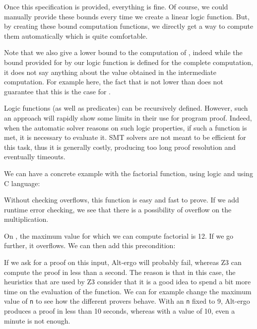 Once this specification is provided, everything is fine. Of course, we could
manually provide these bounds every time we create a linear logic function. But,
by creating these bound computation functions, we directly get a way to compute
them automatically which is quite comfortable.

Note that we also give a lower bound to the computation of ,
indeed while the bound provided for  by our logic function is
defined for the complete computation, it does not say anything about the value
obtained in the intermediate computation. For example here, the fact that
 is not lower than  does not
guarantee that this is the case for . 





Logic functions (as well as predicates) can be recursively defined.
However, such an approach will rapidly show some limits in their use for
program proof. Indeed, when the automatic solver reasons on such logic
properties, if such a function is met, it is necessary to evaluate it.
SMT solvers are not meant to be efficient for this task, thus it is generally
costly, producing too long proof resolution and eventually timeouts.

We can have a concrete example with the factorial function, using logic
and using C language:






Without checking overflows, this function is easy and fast to prove. If
we add runtime error checking, we see that there is a possibility of
overflow on the multiplication.



On , the maximum value for which we can compute
factorial is 12. If we go further, it overflows. We can then add this
precondition:






If we ask for a proof on this input, Alt-ergo will probably fail,
whereas Z3 can compute the proof in less than a second. The reason is
that in this case, the heuristics that are used by Z3 consider that it
is a good idea to spend a bit more time on the evaluation of the
function. We can for example change the maximum value of \texttt{n} to
see how the different provers behave. With an \texttt{n} fixed to 9,
Alt-ergo produces a proof in less than 10 seconds, whereas with a value
of 10, even a minute is not enough.



